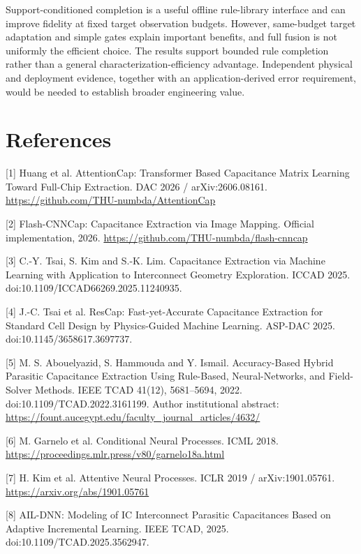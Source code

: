 \documentclass[10pt,twocolumn]{article}
\begin{document}
Support-conditioned completion is a useful offline rule-library interface and can improve fidelity at fixed target observation budgets. However, same-budget target adaptation and simple gates explain important benefits, and full fusion is not uniformly the efficient choice. The results support bounded rule completion rather than a general characterization-efficiency advantage. Independent physical and deployment evidence, together with an application-derived error requirement, would be needed to establish broader engineering value.

\section*{References}

[1] Huang et al. AttentionCap: Transformer Based Capacitance Matrix Learning Toward Full-Chip Extraction. DAC 2026 / arXiv:2606.08161. \url{https://github.com/THU-numbda/AttentionCap}

[2] Flash-CNNCap: Capacitance Extraction via Image Mapping. Official implementation, 2026. \url{https://github.com/THU-numbda/flash-cnncap}

[3] C.-Y. Tsai, S. Kim and S.-K. Lim. Capacitance Extraction via Machine Learning with Application to Interconnect Geometry Exploration. ICCAD 2025. doi:10.1109/ICCAD66269.2025.11240935.

[4] J.-C. Tsai et al. ResCap: Fast-yet-Accurate Capacitance Extraction for Standard Cell Design by Physics-Guided Machine Learning. ASP-DAC 2025. doi:10.1145/3658617.3697737.

[5] M. S. Abouelyazid, S. Hammouda and Y. Ismail. Accuracy-Based Hybrid Parasitic Capacitance Extraction Using Rule-Based, Neural-Networks, and Field-Solver Methods. IEEE TCAD 41(12), 5681--5694, 2022. doi:10.1109/TCAD.2022.3161199. Author institutional abstract: \url{https://fount.aucegypt.edu/faculty_journal_articles/4632/}

[6] M. Garnelo et al. Conditional Neural Processes. ICML 2018. \url{https://proceedings.mlr.press/v80/garnelo18a.html}

[7] H. Kim et al. Attentive Neural Processes. ICLR 2019 / arXiv:1901.05761. \url{https://arxiv.org/abs/1901.05761}

[8] AIL-DNN: Modeling of IC Interconnect Parasitic Capacitances Based on Adaptive Incremental Learning. IEEE TCAD, 2025. doi:10.1109/TCAD.2025.3562947. 
\end{document}

